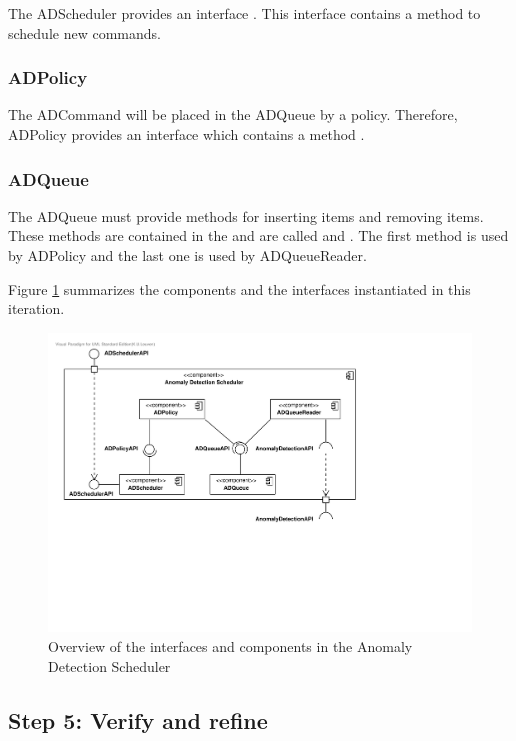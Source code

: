 \npar The ADScheduler provides an interface
. This interface contains a method
 to schedule new commands.

\subsubsection{ADPolicy}

\npar The ADCommand will be placed in the ADQueue by a policy. Therefore,
ADPolicy provides an interface  which contains a method
.

\subsubsection{ADQueue}

\npar The ADQueue must provide methods for inserting items and removing items.
These methods are contained in the  and are called
 and . The first
method is used by ADPolicy and the last one is used by ADQueueReader.

\npar Figure \ref{fig:it5/interfaces} summarizes the components and the
interfaces instantiated in this iteration.

\begin{figure}[H]
	\begin{centering}
		\includegraphics[width=\textwidth]{figs/add-it5-interfaces.pdf}
		\caption{Overview of the interfaces and components in the Anomaly Detection
		Scheduler}
		\label{fig:it5/interfaces}
	\end{centering}
\end{figure}

\subsection{Step 5: Verify and refine}
\label{add:it5/verification}

